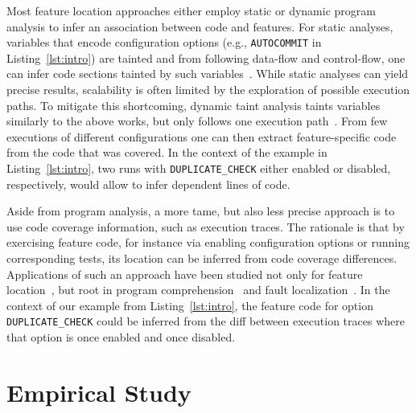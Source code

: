 Most feature location approaches either employ static or dynamic program analysis to infer an association between code and features. For static analyses, variables that encode configuration options (e.g., \texttt{AUTOCOMMIT} in Listing~\ref{lst:intro}) are tainted and from following data-flow and control-flow, one can infer code sections tainted by such variables~\cite{velez_2020_configcrusher_jase,lillack_2018_lotrack_tse,luo_2019_cova}.
While static analyses can yield precise results, scalability is often limited by the exploration of possible execution paths. To mitigate this shortcoming, dynamic taint analysis taints variables similarly to the above works, but only follows one execution path~\cite{bell_phosphor_2014,velez_comprex_2021,splat_kim_2013}. From few executions of different configurations one can then extract feature-specific code from the code that was covered. In the context of the example in Listing~\ref{lst:intro}, two runs with \texttt{DUPLICATE\_CHECK} either enabled or disabled, respectively, would allow to infer dependent lines of code.


Aside from program analysis, a more tame, but also less precise approach is to use code coverage information, such as execution traces.
The rationale is that by exercising feature code, for instance via enabling configuration options or running corresponding tests, its location can be inferred from code coverage differences. Applications of such an approach have been studied not only for feature location~\cite{wong_integrated_2005,sulir_annotation_2015,michelon_spectrum_2021,perez_framing_2016}, but root in program comprehension~\cite{wilde_early_1996,wilde_reconnaissance_1995,sherwood_reducing_nodate,perez_diagnosis_2014,castro_pangolin_2019} and fault localization~\cite{agrawal_fault_1995,wong_faultloc_2016}. In the context of our example from Listing~\ref{lst:intro}, the feature code for option \texttt{DUPLICATE\_CHECK} could be inferred from the diff between execution traces where that option is once enabled and once disabled.


\section{Empirical Study}~\label{sec:study}


